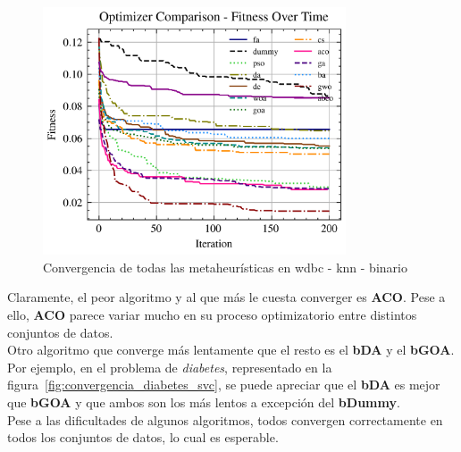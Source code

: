 \begin{figure}[htp]
    \includegraphics[width=0.8\textwidth]{imagenes/fitness_charts/img/binary/wdbc/optimizers_fitness_knn.png}
    \caption{Convergencia de todas las metaheurísticas en wdbc - knn - binario}
\end{figure}

Claramente, el peor algoritmo y al que más le cuesta converger es \textbf{ACO}. Pese a ello, \textbf{ACO} parece variar mucho en su proceso optimizatorio entre distintos conjuntos de datos.\\[6pt]
Otro algoritmo que converge más lentamente que el resto es el \textbf{bDA} y el \textbf{bGOA}. Por ejemplo, en el problema de \textit{diabetes}, representado en la figura~\ref{fig:convergencia_diabetes_svc}, se puede apreciar que el \textbf{bDA} es mejor que \textbf{bGOA} y que ambos son los más lentos a excepción del \textbf{bDummy}. \\[6pt]

Pese a las dificultades de algunos algoritmos, todos convergen correctamente en todos los conjuntos de datos, lo cual es esperable.

